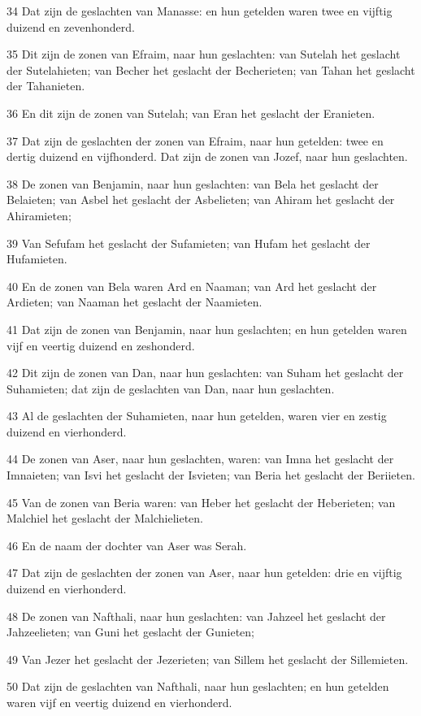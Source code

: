 \par 34 Dat zijn de geslachten van Manasse: en hun getelden waren twee en vijftig duizend en zevenhonderd.
\par 35 Dit zijn de zonen van Efraim, naar hun geslachten: van Sutelah het geslacht der Sutelahieten; van Becher het geslacht der Becherieten; van Tahan het geslacht der Tahanieten.
\par 36 En dit zijn de zonen van Sutelah; van Eran het geslacht der Eranieten.
\par 37 Dat zijn de geslachten der zonen van Efraim, naar hun getelden: twee en dertig duizend en vijfhonderd. Dat zijn de zonen van Jozef, naar hun geslachten.
\par 38 De zonen van Benjamin, naar hun geslachten: van Bela het geslacht der Belaieten; van Asbel het geslacht der Asbelieten; van Ahiram het geslacht der Ahiramieten;
\par 39 Van Sefufam het geslacht der Sufamieten; van Hufam het geslacht der Hufamieten.
\par 40 En de zonen van Bela waren Ard en Naaman; van Ard het geslacht der Ardieten; van Naaman het geslacht der Naamieten.
\par 41 Dat zijn de zonen van Benjamin, naar hun geslachten; en hun getelden waren vijf en veertig duizend en zeshonderd.
\par 42 Dit zijn de zonen van Dan, naar hun geslachten: van Suham het geslacht der Suhamieten; dat zijn de geslachten van Dan, naar hun geslachten.
\par 43 Al de geslachten der Suhamieten, naar hun getelden, waren vier en zestig duizend en vierhonderd.
\par 44 De zonen van Aser, naar hun geslachten, waren: van Imna het geslacht der Imnaieten; van Isvi het geslacht der Isvieten; van Beria het geslacht der Beriieten.
\par 45 Van de zonen van Beria waren: van Heber het geslacht der Heberieten; van Malchiel het geslacht der Malchielieten.
\par 46 En de naam der dochter van Aser was Serah.
\par 47 Dat zijn de geslachten der zonen van Aser, naar hun getelden: drie en vijftig duizend en vierhonderd.
\par 48 De zonen van Nafthali, naar hun geslachten: van Jahzeel het geslacht der Jahzeelieten; van Guni het geslacht der Gunieten;
\par 49 Van Jezer het geslacht der Jezerieten; van Sillem het geslacht der Sillemieten.
\par 50 Dat zijn de geslachten van Nafthali, naar hun geslachten; en hun getelden waren vijf en veertig duizend en vierhonderd.
